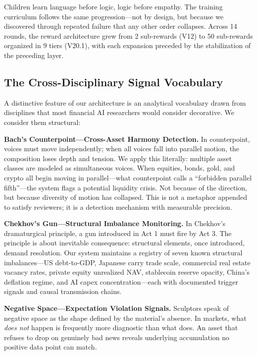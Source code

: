 \documentclass[11pt,a4paper]{article}
\begin{document}
Children learn language before logic, logic before empathy. The training curriculum follows the same progression---not by design, but because we discovered through repeated failure that any other order collapses. Across 14 rounds, the reward architecture grew from 2 sub-rewards (V12) to 50 sub-rewards organized in 9 tiers (V20.1), with each expansion preceded by the stabilization of the preceding layer.

\subsection{The Cross-Disciplinary Signal Vocabulary}

A distinctive feature of our architecture is an analytical vocabulary drawn from disciplines that most financial AI researchers would consider decorative. We consider them structural:

\textbf{Bach's Counterpoint---Cross-Asset Harmony Detection.} In counterpoint, voices must move independently; when all voices fall into parallel motion, the composition loses depth and tension. We apply this literally: multiple asset classes are modeled as simultaneous voices. When equities, bonds, gold, and crypto all begin moving in parallel---what counterpoint calls a ``forbidden parallel fifth''---the system flags a potential liquidity crisis. Not because of the direction, but because diversity of motion has collapsed. This is not a metaphor appended to satisfy reviewers; it is a detection mechanism with measurable precision.

\textbf{Chekhov's Gun---Structural Imbalance Monitoring.} In Chekhov's dramaturgical principle, a gun introduced in Act 1 must fire by Act 3. The principle is about inevitable consequence: structural elements, once introduced, demand resolution. Our system maintains a registry of seven known structural imbalances---US debt-to-GDP, Japanese carry trade scale, commercial real estate vacancy rates, private equity unrealized NAV, stablecoin reserve opacity, China's deflation regime, and AI capex concentration---each with documented trigger signals and causal transmission chains.

\textbf{Negative Space---Expectation Violation Signals.} Sculptors speak of negative space as the shape defined by the material's absence. In markets, what \textit{does not} happen is frequently more diagnostic than what does. An asset that refuses to drop on genuinely bad news reveals underlying accumulation no positive data point can match.
\end{document}
